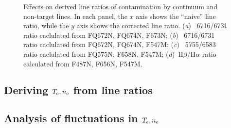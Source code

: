 \documentclass[preprint]{aastex}
\begin{document}
\begin{figure}
\begin{tabular}{ll}
  \end{tabular}
  \caption{Effects on derived line ratios of contamination by
    continuum and non-target lines.  In each panel, the \(x\) axis
    shows the ``naive'' line ratio, while the \(y\) axis shows the
    corrected line ratio.  (\textit{a})~\sii{} 6716/6731 ratio
    caclulated from FQ672N, FQ674N, F673N; (\textit{b})~\sii{} 6716/6731 ratio
    caclulated from FQ672N, FQ674N, F547M; (\textit{c})~\nii{} 5755/6583 ratio
    caclulated from  FQ575N, F658N, F547M;
    (\textit{d})~H\(\beta\)/H\(\alpha\) ratio calculated from F487N,
    F656N, F547M.}
  \label{fig:contam}
\end{figure}




\subsection{\boldmath Deriving \(T_{\mathrm{e}}, n_{\mathrm{e}}\) from line ratios}
\label{sec:derive}



\subsection{\boldmath Analysis of fluctuations in \(T_{\mathrm{e}}, n_{\mathrm{e}}\)}
\label{sec:fluct}



\end{document}
